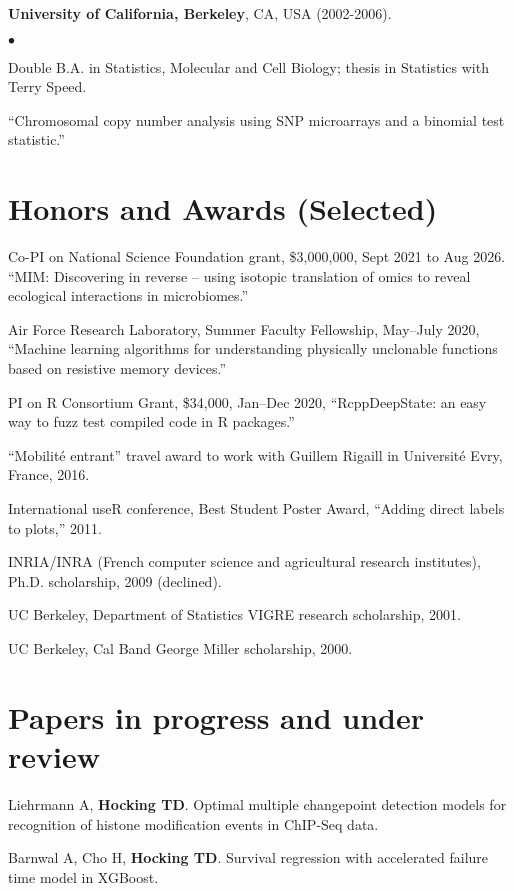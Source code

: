 \documentclass[margin,line]{res}
\newenvironment{list2}{
  \begin{list}{$\bullet$}{%
      \setlength{\itemsep}{0in}
      \setlength{\parsep}{0in} \setlength{\parskip}{0in}
      \setlength{\topsep}{0in} \setlength{\partopsep}{0in} 
      \setlength{\leftmargin}{0.2in}}}{\end{list}}
\begin{document}
\begin{resume}
{\bf University of California, Berkeley}, CA, USA (2002-2006).\\
\vspace*{-.1in}
\begin{list2}
\item[] Double B.A. in Statistics, Molecular and Cell Biology; thesis in Statistics with Terry Speed.
\item[] ``Chromosomal copy number analysis using SNP microarrays and a binomial test statistic.'' 
\end{list2}

\section{\sc Honors and Awards (Selected)}

Co-PI on National Science Foundation grant, \$3,000,000, Sept 2021 to
Aug 2026. ``MIM: Discovering in reverse – using isotopic translation
of omics to reveal ecological interactions in microbiomes.''

Air Force Research Laboratory, Summer Faculty Fellowship, May--July
2020, ``Machine learning algorithms for understanding physically
unclonable functions based on resistive memory devices.''

PI on R Consortium Grant, \$34,000, Jan--Dec 2020, ``RcppDeepState: an easy
way to fuzz test compiled code in R packages.''

``Mobilit\'e entrant'' travel award to work with Guillem Rigaill in
Universit\'e Evry, France, 2016.

International useR conference, Best Student Poster Award, ``Adding
direct labels to plots,'' 2011.

INRIA/INRA (French computer science and agricultural research institutes), Ph.D. scholarship, 2009 (declined).

UC Berkeley, Department of Statistics VIGRE research scholarship, 2001.

UC Berkeley, Cal Band George Miller scholarship, 2000.

\section{\sc Papers in progress and under review}

Liehrmann A, {\bf Hocking TD}. Optimal multiple changepoint detection
models for recognition of histone modification events in ChIP-Seq
data.

Barnwal A, Cho H, {\bf Hocking TD}. Survival regression with accelerated
failure time model in XGBoost.


\end{resume}
\end{document}
